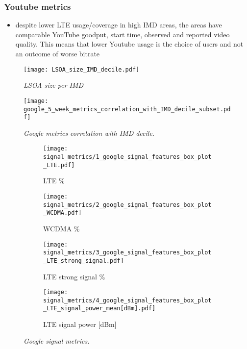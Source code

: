 \subsubsection{Youtube metrics}
\begin{itemize}[noitemsep]
\item despite lower LTE usage/coverage in high IMD areas, the areas have comparable YouTube goodput, start time, observed and reported  video quality. This means that lower Youtube usage is the choice of users and not an outcome of worse bitrate
\end{itemize}

\begin{figure}
	\centering
	\texttt{[image: LSOA\_size\_IMD\_decile.pdf]}
	\caption{\textit{LSOA size per IMD}}
	\label{fig:LSOA_IMD_size}
\end{figure}

\begin{figure}
	\centering
	\texttt{[image: google\_5\_week\_metrics\_correlation\_with\_IMD\_decile\_subset.pdf]}
	\caption{\textit{Google metrics correlation with IMD decile.}}
	\label{fig:google_metrics_correlation_with_imd_decile}
\end{figure}

\begin{figure}
	\centering
	\begin{subfigure}[b]{0.37	\linewidth}
		\texttt{[image: signal\_metrics/1\_google\_signal\_features\_box\_plot\_LTE.pdf]}
		\caption{\scriptsize{LTE \%}}
	\end{subfigure}
	\hspace{0.5cm}
	\begin{subfigure}[b]{0.37	\linewidth}
		\texttt{[image: signal\_metrics/2\_google\_signal\_features\_box\_plot\_WCDMA.pdf]}
		\caption{\scriptsize{WCDMA \%}}
	\end{subfigure}	
	\begin{subfigure}[b]{0.37	\linewidth}
		\texttt{[image: signal\_metrics/3\_google\_signal\_features\_box\_plot\_LTE\_strong\_signal.pdf]}
		\caption{\scriptsize{LTE strong signal \%}}
	\end{subfigure}
	\begin{subfigure}[b]{0.45	\linewidth}
		\texttt{[image: signal\_metrics/4\_google\_signal\_features\_box\_plot\_LTE\_signal\_power\_mean[dBm].pdf]}
		\caption{\scriptsize{LTE signal power [dBm]}}
	\end{subfigure}
\caption{\textit{Google signal metrics.}}
\label{fig:google_signal_metrics}
\end{figure}

